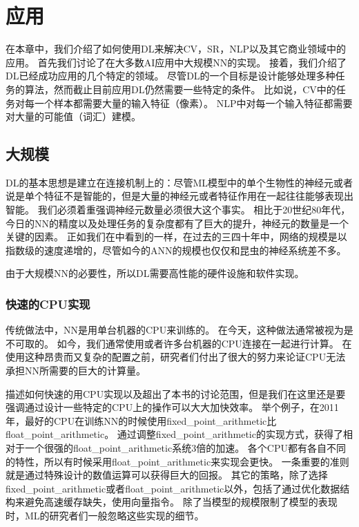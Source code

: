 \chapter{应用}
\label{chap:applications}

在本章中，我们介绍了如何使用\gls{DL}来解决\gls{CV}，\gls{SR}，\gls{NLP}以及其它商业领域中的应用。
首先我们讨论了在大多数\gls{AI}应用中大规模\gls{NN}的实现。
接着，我们介绍了\gls{DL}已经成功应用的几个特定的领域。
尽管\gls{DL}的一个目标是设计能够处理多种任务的算法，然而截止目前应用\gls{DL}仍然需要一些特定的条件。
比如说，\gls{CV}中的任务对每一个样本都需要大量的输入特征（像素）。
\gls{NLP}中对每一个输入特征都需要对大量的可能值（词汇）建模。

\section{大规模}
\label{sec:large_scale_deep_learning}

\gls{DL}的基本思想是建立在连接机制上的：尽管\gls{ML}模型中的单个生物性的神经元或者说是单个特征不是智能的，但是大量的神经元或者特征作用在一起往往能够表现出智能。
我们必须着重强调神经元数量必须很大这个事实。
相比于20世纪80年代，今日的\gls{NN}的精度以及处理任务的复杂度都有了巨大的提升，神经元的数量是一个关键的因素。
正如我们在中看到的一样，在过去的三四十年中，网络的规模是以指数级的速度递增的，尽管如今的\gls{ANN}的规模也仅仅和昆虫的神经系统差不多。

由于大规模\gls{NN}的必要性，所以\gls{DL}需要高性能的硬件设施和软件实现。

\subsection{快速的CPU实现}
\label{sec:fast_cpu_implementations}

传统做法中，\gls{NN}是用单台机器的CPU来训练的。
在今天，这种做法通常被视为是不可取的。
如今，我们通常使用或者许多台机器的CPU连接在一起进行计算。
在使用这种昂贵而又复杂的配置之前，研究者们付出了很大的努力来论证CPU无法承担\gls{NN}所需要的巨大的计算量。


描述如何快速的用CPU实现以及超出了本书的讨论范围，但是我们在这里还是要强调通过设计一些特定的CPU上的操作可以大大加快效率。
举个例子，在2011年，最好的CPU在训练\gls{NN}的时候使用\gls{fixed_point_arithmetic}比\gls{float_point_arithmetic}。
通过调整\gls{fixed_point_arithmetic}的实现方式，\citet{Vanhoucke-et-al-2011}获得了相对于一个很强的\gls{float_point_arithmetic}系统3倍的加速。
各个CPU都有各自不同的特性，所以有时候采用\gls{float_point_arithmetic}来实现会更快。
一条重要的准则就是通过特殊设计的数值运算可以获得巨大的回报。
其它的策略，除了选择\gls{fixed_point_arithmetic}或者\gls{float_point_arithmetic}以外，包括了通过优化数据结构来避免高速缓存缺失，使用向量指令。
除了当模型的规模限制了模型的表现时，\gls{ML}的研究者们一般忽略这些实现的细节。

